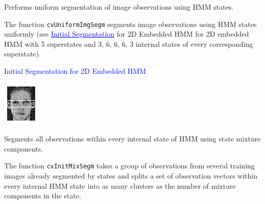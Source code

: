 

Performs uniform segmentation of image observations using HMM states.


\begin{description}
\end{description}

The function \texttt{cvUniformImgSegm} segments image observations using HMM states uniformly (see \textcolor{blue}{\underline{Initial Segmentation}} for 2D Embedded HMM for 2D embedded HMM with 5 superstates and 3, 6, 6, 6, 3 internal states of every corresponding superstate).

\textcolor{blue}{Initial Segmentation for 2D Embedded HMM}

\includegraphics{pics/face.png}


Segments all observations within every internal state of HMM using state mixture components.


\begin{description}
\end{description}

The function \texttt{cvInitMixSegm} takes a group of observations from several training images already segmented by states and splits a set of observation vectors within every internal HMM state into as many clusters as the number of mixture components in the state.

